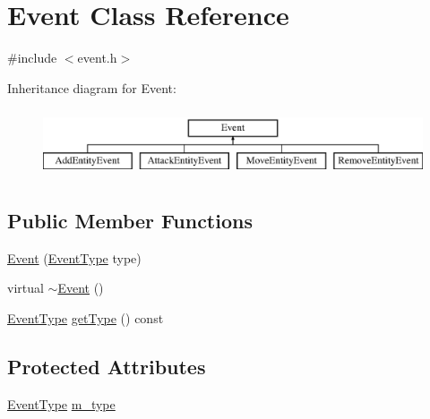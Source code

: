 \hypertarget{classEvent}{\section{Event Class Reference}
\label{classEvent}
}


{\ttfamily \#include $<$event.\-h$>$}

Inheritance diagram for Event\-:\begin{figure}[H]
\begin{center}
\leavevmode
\includegraphics[height=2.000000cm]{classEvent}
\end{center}
\end{figure}
\subsection*{Public Member Functions}
\begin{DoxyCompactItemize}
\item 
\hyperlink{classEvent_aa3b8f22d374f6abfe0893bccea58a5de}{Event} (\hyperlink{event_8h_a2628ea8d12e8b2563c32f05dc7fff6fa}{Event\-Type} type)
\item 
virtual \hyperlink{classEvent_ab864fd85c758006c42cd7a1b3369b483}{$\sim$\-Event} ()
\item 
\hyperlink{event_8h_a2628ea8d12e8b2563c32f05dc7fff6fa}{Event\-Type} \hyperlink{classEvent_ab0c2e30730d5859851f3126258c0126e}{get\-Type} () const 
\end{DoxyCompactItemize}
\subsection*{Protected Attributes}
\begin{DoxyCompactItemize}
\item 
\hyperlink{event_8h_a2628ea8d12e8b2563c32f05dc7fff6fa}{Event\-Type} \hyperlink{classEvent_a38264e3fb229dc64123dff1d5a7dcf9e}{m\-\_\-type}
\end{DoxyCompactItemize}


